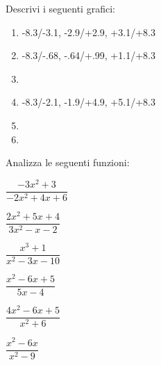 \begin{esercizio}\label{ese:stufun.3g}
Descrivi i seguenti grafici:
\begin{multicols}{2}
 \begin{enumerate} [left=0pt, label=\alph*)]
  \item \myp 
{} 
{-8.3/-3.1, -2.9/+2.9, +3.1/+8.3}%
  \item \myp 
{} 
{-8.3/-.68, -.64/+.99, +1.1/+8.3}%
  \item \myp 
{}%
  \item \myp 
{} 
{-8.3/-2.1, -1.9/+4.9, +5.1/+8.3}%
\item \myp 
{}%
\item \myp 
{}%
 \end{enumerate}
\end{multicols}
\end{esercizio}

\begin{esercizio}\label{ese:stufun.3e}
Analizza le seguenti funzioni:
\begin{multicols}{3}
 \begin{enumeratea}
  \item \(\dfrac{-3x^2 +3}{-2x^2 +4x +6}\) %
  \item \(\dfrac{2x^2+5x+4}{3x^2-x-2}\) %
  \item \(\dfrac{x^3 +1}{x^2 -3x -10}\) %
  \item \(\dfrac{x^2 - 6x + 5}{5x - 4}\) %
  \item \(\dfrac{4x^2 -6x +5}{x^2 +6}\) %
  \item \(\dfrac{x^2 -6x}{x^2 -9}\) %
 \end{enumeratea}
\end{multicols}
\end{esercizio}

\bigskip

